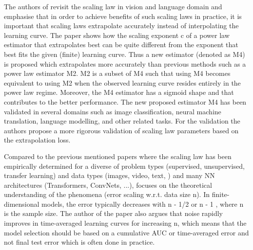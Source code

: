 \documentclass{article} %
\begin{document}
The authors of \cite{alabdulmohsin2022revisiting} revisit the scaling law in vision and language domain and emphasise that in order to achieve benefits of such scaling laws in practice, it is important that scaling laws extrapolate accurately instead of interpolating the learning curve. The paper shows how the scaling exponent c of a power law estimator that extrapolates best can be quite different from the exponent that best fits the given (finite) learning curve. Thus a new estimator (denoted as M4) is proposed which extrapolates more accurately than previous methods such as a power law estimator M2. M2 is a subset of M4 such that using M4 becomes equivalent to using M2 when the observed learning curve resides entirely in the power law regime. Moreover, the M4 estimator has a sigmoid shape and that contributes to the better performance. The new proposed estimator M4 has been validated in several domains such as image classification, neural machine translation, language modelling, and other related tasks. For the validation the authors propose a more rigorous validation of scaling law parameters based on the extrapolation loss.

Compared to the previous mentioned papers where the scaling law has been empirically determined for a diverse of problem types (supervised, unsupervised, transfer learning) and data types (images, video, text, ) and many NN architectures (Transformers, ConvNets, ...), \cite{hutter2021learning} focuses on the theoretical understanding of the phenomena (error scaling w.r.t. data size n). In finite-dimensional models, the error typically decreases with n - 1/2 or n - 1 , where n is the sample size. The author of the paper also argues that noise rapidly improves in time-averaged learning curves for increasing n, which means that the model selection should be based on a cumulative AUC or time-averaged error and not final test error which is often done in practice.


\end{document}
